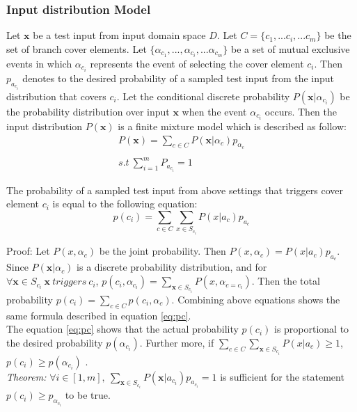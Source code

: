\documentclass[journal]{IEEEtran}
\renewcommand{\vec}[1]{\mathbf{#1}}
\begin{document}
\subsubsection{Input distribution Model}
Let \(\vec{x}\) be a test input from input domain space \(D\). Let \(C = \{c_{1},...c_{i},...c_{m}\}\) be the set of branch cover elements. Let \(\{\alpha_{c_{1}},...,\alpha_{c_{i}},...\alpha_{c_{m}}\}\) be a set of mutual exclusive events in which \(\alpha_{c_{i}}\) represents the event of selecting the cover element \(c_{i}\). Then  \(p_{a_{c_{i}}}\) denotes to the desired probability of a sampled test input from the input distribution that covers \(c_{i}\). 
Let the conditional discrete probability \(P(\vec{x}|\alpha_{c_{i}})\) be the probability distribution over input \(\vec{x}\) when the event \(\alpha_{c_{i}}\) occurs.
Then the input distribution \(P(\vec{x})\) is a finite mixture model which is described as follow:
\begin{equation}
\begin{array}{ll}
P(\vec{x}) = \sum_{c\in C}P(\vec{x}|\alpha_{c})p_{\alpha_{c}}\\\\
s.t\  \sum_{i=1}^{m}P_{a_{c_{i}}} = 1
\end{array}
\tag{2}
\end{equation}

The probability of a sampled test input from above settings that triggers cover element \(c_{i}\) is equal to the following equation:
\begin{equation*}
\label{eq:pc}
p(c_{i}) = \sum_{c \in C}\sum_{x \in S_{c_{i}}}P(x|a_{c})p_{a_{c}}
\tag{3}
\end{equation*}

Proof: Let \(P(x,\alpha_{c})\) be the joint probability. Then \(\label{eq:a}P(x,\alpha_{c}) = P(x|a_{c})p_{a_{c}}\). Since \(P(\vec{x}|\alpha_{c})\) is a discrete probability distribution, and for \(\forall \vec{x} \in S_{c_{i}}\ \vec{x}\ triggers \ c_{i}\), \(p(c_{i},\alpha_{c_{i}}) = \sum_{\vec{x} \in S_{c_{i}}}P(x,\alpha_{c=c_{i}})\). Then the total probability \(\label{eq:c}p(c_{i}) = \sum_{c\in C}p(c_{i},\alpha_{c})\). Combining above equations shows the same formula described in equation \ref{eq:pc}.\\

The equation \ref{eq:pc} shows that the actual probability \(p(c_{i})\) is proportional to the desired probability \(p(\alpha_{c_{i}})\). Further more, if \(\sum_{c \in C}\sum_{\vec{x} \in S_{c_{i}}}P(x|a_{c}) \geq 1\), \(p(c_{i}) \geq p(\alpha_{c_{i}})\) . \\
\emph{Theorem:} \(\forall i \in [1,m],\ \sum_{\vec{x} \in S_{c_{i}}}P(\vec{x}|a_{c_{i}})p_{a_{c_{i}}} = 1\) is sufficient for the statement \(p(c_{i}) \geq p_{\alpha_{c_{i}}}\) to be true.\\
\end{document}

